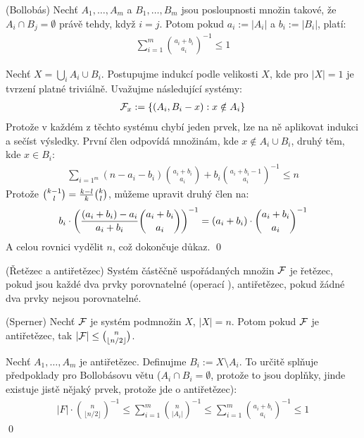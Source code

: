 \vt (Bollobás) Nechť $A_1, \dots, A_m$ a $B_1, \dots, B_m$ jsou posloupnosti
množin takové, že $A_i \cap B_j = \emptyset$ právě tehdy, když $i = j$. Potom
pokud $a_i := |A_i|$ a $b_i := |B_i|$, platí:
\begin{align}
	\sum_{i=1}^m\binom{a_i + b_i}{a_i}^{-1} \leq 1
\end{align}

\dk Nechť $X = \bigcup_i A_i \cup B_i$. Postupujme indukcí podle velikosti $X$,
kde pro $|X| = 1$ je tvrzení platné triviálně. Uvažujme následující systémy:
\begin{align}
	\mathcal{F}_x := \{ (A_i, B_i - x) : x \notin A_i\}
\end{align}
Protože v každém z těchto systému chybí jeden prvek, lze na ně aplikovat indukci
a sečíst výsledky. První člen odpovídá množinám, kde $x\notin A_i \cup B_i$,
druhý těm, kde $x \in B_i$:
\begin{align}
	\sum_{i=1^m}(n-a_i-b_i) \binom{a_i+b_i}{a_i} + b_i\binom{a_i+b_i-1}{a_i}^{-1} \leq
	n
\end{align}
Protože $\binom{k-1}{l} = {k-l\over k}\binom{k}{l}$, můžeme upravit druhý člen
na:
\begin{align}
	b_i \cdot \left({(a_i+b_i)-a_i \over a_i+b_i}
	\binom{a_i+b_i}{a_i}\right)^{-1} = (a_i + b_i) \cdot
	\binom{a_i+b_i}{a_i}^{-1}
\end{align}
A celou rovnici vydělit $n$, což dokončuje důkaz. \qed

\df (Řetězec a antiřetězec) Systém částěčně uspořádaných množin $\mathcal{F}$ je řetězec,
pokud jsou každé dva prvky porovnatelné (operací ), antiřetězec,
pokud žádné dva prvky nejsou porovnatelné.

\vt (Sperner) Nechť $\mathcal{F}$ je systém podmnožin $X$, $|X| = n$. Potom pokud $\mathcal{F}$ je
antiřetězec, tak $|\mathcal{F}| \leq \binom{n}{\lfloor n/2 \rfloor}$.

\dk Nechť $A_1, \dots, A_m$ je antiřetězec. Definujme $B_i := X \setminus A_i$.
To určitě splňuje předpoklady pro Bollobásovu větu ($A_i \cap B_i = \emptyset$,
protože to jsou doplňky, jinde existuje jistě nějaký prvek, protože jde o
antiřetězec):
\begin{align}
	|F| \cdot \binom{n}{\lfloor n/2 \rfloor}^{-1} \leq
	\sum_{i=1}^m\binom{n}{|A_i|}^{-1} \leq \sum_{i=1}^m \binom{a_i +
	b_i}{a_i}^{-1} \leq 1
\end{align}
\qed
